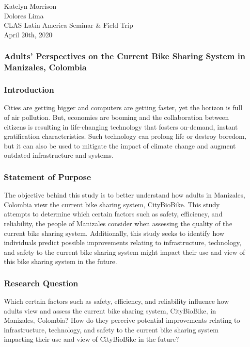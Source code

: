 \documentclass[12pt]{article}
\begin{document}
\begin{flushleft}

Katelyn Morrison\\
Dolores Lima\\
CLAS Latin America Seminar \& Field Trip\\
April 20th, 2020\\
\end{flushleft}

\begin{center}
\subsubsection*{Adults' Perspectives on the Current Bike Sharing System in Manizales, Colombia}
\end{center}

\subsubsection*{Introduction}
Cities are getting bigger and computers are getting faster, yet the horizon is full of air pollution. But, economies are booming and the collaboration between citizens is resulting in life-changing technology that fosters on-demand, instant gratification characteristics. Such technology can prolong life or destroy boredom, but it can also be used to mitigate the impact of climate change and augment outdated infrastructure and systems. 
\medskip
\subsubsection*{Statement of Purpose}
The objective behind this study is to better understand how adults in Manizales, Colombia view the current bike sharing system, CityBioBike.
This study attempts to determine which certain factors such as safety, efficiency, and reliability,
the people of Manizales consider when assessing the quality of the current bike sharing system. Additionally, this study seeks to identify how individuals predict
possible improvements relating to infrastructure, technology, and safety to the current bike sharing system might 
impact their use and view of this bike sharing system in the future.
\subsubsection*{Research Question}
Which certain factors such as safety, efficiency, and reliability influence how 
adults view and assess the current bike sharing system, CityBioBike, in Manizales, Colombia? 
How do they perceive potential improvements relating to infrastructure, technology, and safety
to the current bike sharing system impacting their use and view of CityBioBike in the future?
\end{document}
